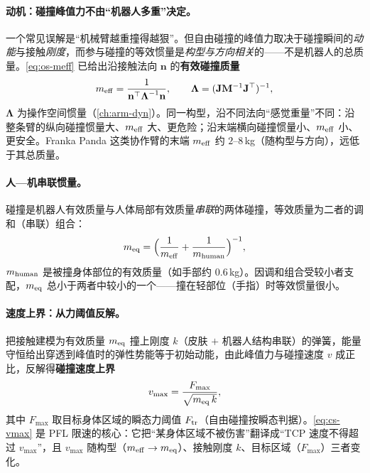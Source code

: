 \paragraph{动机：碰撞峰值力不由“机器人多重”决定。}
一个常见误解是“机械臂越重撞得越狠”。但自由碰撞的峰值力取决于碰撞瞬间的\emph{动能}与接触\emph{刚度}，而参与碰撞的等效惯量是\emph{构型与方向相关}的——不是机器人的总质量。\cref{eq:os-meff} 已给出沿接触法向 $\mathbf n$ 的\textbf{有效碰撞质量}
\begin{equation}
  m_{\rm eff}=\frac{1}{\mathbf n^\top\boldsymbol\Lambda^{-1}\mathbf n},
  \qquad \boldsymbol\Lambda=(\mathbf J\mathbf M^{-1}\mathbf J^\top)^{-1},
  \label{eq:cs-meff}
\end{equation}
$\boldsymbol\Lambda$ 为操作空间惯量（\cref{ch:arm-dyn}）。同一构型，沿不同法向“感觉重量”不同：沿整条臂的纵向碰撞惯量大、$m_{\rm eff}$ 大、更危险；沿末端横向碰撞惯量小、$m_{\rm eff}$ 小、更安全。Franka Panda 这类协作臂的末端 $m_{\rm eff}$ 约 $2$--$8$\,kg（随构型与方向），远低于其总质量。

\paragraph{人—机串联惯量。}
碰撞是机器人有效质量与人体局部有效质量\emph{串联}的两体碰撞，等效质量为二者的调和（串联）组合：
\begin{equation}
  m_{\rm eq}=\Bigl(\frac{1}{m_{\rm eff}}+\frac{1}{m_{\rm human}}\Bigr)^{-1},
  \label{eq:cs-series}
\end{equation}
$m_{\rm human}$ 是被撞身体部位的有效质量（如手部约 $0.6$\,kg）。因调和组合受较小者支配，$m_{\rm eq}$ 总小于两者中较小的一个——撞在轻部位（手指）时等效惯量很小。

\paragraph{速度上界：从力阈值反解。}
把接触建模为有效质量 $m_{\rm eq}$ 撞上刚度 $k$（皮肤 $+$ 机器人结构串联）的弹簧，能量守恒给出穿透到峰值时的弹性势能等于初始动能，由此峰值力与碰撞速度 $v$ 成正比，反解得\textbf{碰撞速度上界}
\begin{equation}
  v_{\max}=\frac{F_{\max}}{\sqrt{m_{\rm eq}\,k}},
  \label{eq:cs-vmax}
\end{equation}
其中 $F_{\max}$ 取目标身体区域的瞬态力阈值 $F_{\rm tr}$（自由碰撞按瞬态判据）。\cref{eq:cs-vmax} 是 PFL 限速的核心：它把“某身体区域不被伤害”翻译成“TCP 速度不得超过 $v_{\max}$”，且 $v_{\max}$ 随构型（$m_{\rm eff}\to m_{\rm eq}$）、接触刚度 $k$、目标区域（$F_{\max}$）三者变化。

